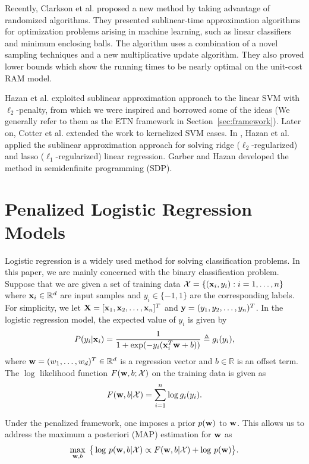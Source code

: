 \documentclass{llncs}
\newcommand{\bw}{\mathbf{w}}
\def\X{{\bf X}}
\def\x{{\bf x}}
\def\y{{\bf y}}
\def\w{{\bf w}}
\def\XM{{\mathcal X}}
\def\RB{{\mathbb R}}
\begin{document}
Recently, Clarkson et al. \cite{clarkson2010sublinear} proposed a new method by taking advantage of randomized algorithms.
They presented sublinear-time approximation algorithms for optimization problems arising in machine learning, such as linear classifiers and minimum enclosing balls.
The algorithm uses a combination of a novel sampling techniques and a new multiplicative update algorithm. They also proved lower bounds which show the running times to be nearly optimal on the unit-cost RAM model.

Hazan et al. \cite{hazanbeating} exploited sublinear approximation approach to the linear SVM with $\ell_2$-penalty, from which we were inspired and borrowed some of the ideas (We generally refer to them as the ETN framework in Section~\ref{sec:framework}).
Later on, Cotter et al. \cite{cotter2012kernelized} extended the work to kernelized SVM cases.
In \cite{hazan2011optimal}, Hazan et al. applied the sublinear approximation approach for solving ridge ($\ell_2$-regularized) and lasso ($\ell_1$-regularized) linear regression.
Garber and Hazan \cite{garberapproximating} developed the method in semidenfinite programming (SDP).

\section{Penalized Logistic Regression Models} \label{sec:plr}
Logistic regression is a widely used method for solving classification problems.
In this paper, we are mainly concerned with the binary classification problem.  	
Suppose that we are given a set of training data $\XM=\{(\x_i, y_i): i=1, \ldots, n\}$ where $\x_i \in \RB^d$ are input samples and $y_i \in \{-1, 1\}$ are the corresponding labels.
For simplicity, we let $\X=[{\x}_{1}, {\x}_{2}, \ldots, {\x}_n]^{T}$ and $\y=(y_1, y_2, \ldots, y_n)^T$.
In the logistic regression model, the expected value of $y_i$ is given by
\[
P(y_i|\x_i)= \frac{1}{1+ \exp(- y_i(\x_i^T \w + b))} \triangleq g_i(y_i),
\]
where $\w=(w_1, \ldots, w_d)^T \in \RB^d$ is a regression vector and $b\in \RB$ is an offset term.
The $\log$ likelihood function $F(\w, b; \XM)$ on the training data is given as
\[
F(\w, b| \XM)
=   \sum_{i=1}^n \log g_i(y_i).
\]

Under the penalized framework, one imposes a prior $p(\w)$ to $\w$. This allows us to address the maximum a posteriori (MAP) estimation for $\w$ as    	 
\begin{equation} \label{eqn:3}
 \max_{\bw ,b} \; \big\{ \log\, p(\bw, b | \XM) \propto F(\w, b| \XM)+ \log\, p(\bw) \big\}.
\end{equation}
\end{document}
